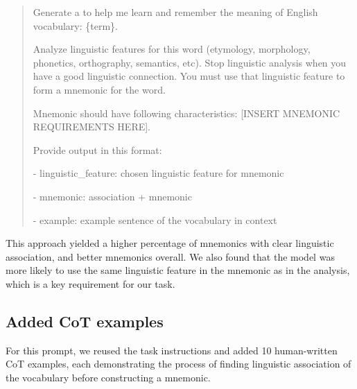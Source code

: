 \begin{quotation}
Generate a \lgm to help me learn and remember the meaning of English vocabulary: \{term\}.

Analyze linguistic features for this word (etymology, morphology, phonetics, orthography, semantics, etc). Stop linguistic analysis when you have a good linguistic connection. You must use that linguistic feature to form a mnemonic for the word.

Mnemonic should have following characteristics:
[INSERT MNEMONIC REQUIREMENTS HERE].

Provide output in this format:

- linguistic\_feature: chosen linguistic feature for mnemonic

- mnemonic: association + mnemonic

- example: example sentence of the vocabulary in context
\end{quotation}

This approach yielded a higher percentage of mnemonics with clear linguistic association, and better mnemonics overall. We also found that the model was more likely to use the same linguistic feature in the mnemonic as in the analysis, which is a key requirement for our task.

\subsection*{Added CoT examples}

For this prompt, we reused the task instructions and added 10 human-written CoT examples, each demonstrating the process of finding linguistic association of the vocabulary before constructing a mnemonic.
